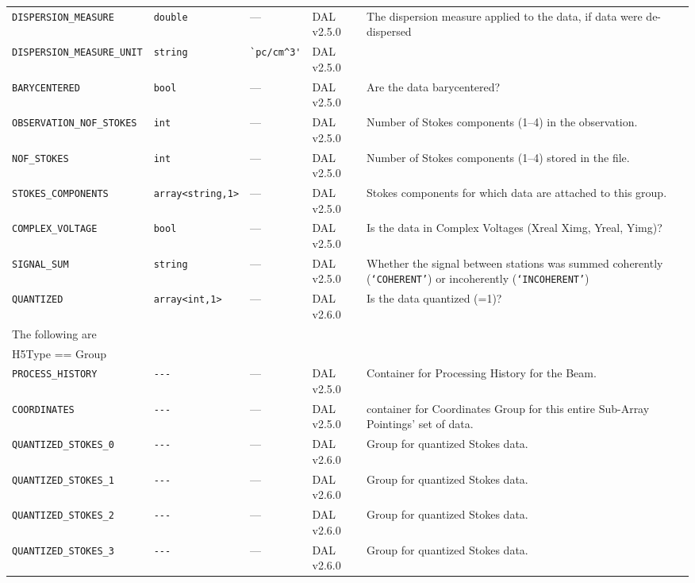 \documentclass[a4paper,10pt,bibtotoc]{scrartcl}
\begin{document}
\begin{supertabular}{|llllp{5.0cm}|}
  \small{\verb|DISPERSION_MEASURE|}     & \verb|double| & --- & DAL v2.5.0 &  The dispersion 
  measure applied to the data, if data were de-dispersed \\
  \small{\verb|DISPERSION_MEASURE_UNIT|}     & \verb|string| & \verb|`pc/cm^3'| & DAL v2.5.0 & \\
  \small{\verb|BARYCENTERED|}   & \verb|bool| & --- & DAL v2.5.0 & Are the data barycentered? \\
  \small{\verb|OBSERVATION_NOF_STOKES|}   & \verb|int|     & --- & DAL v2.5.0 & Number of Stokes
  components (1--4) in the observation. \\
  \small{\verb|NOF_STOKES|}   & \verb|int|     & --- & DAL v2.5.0 & Number of Stokes
  components (1--4) stored in the file. \\
  \small{\verb|STOKES_COMPONENTS|} & \verb|array<string,1>| & --- & DAL v2.5.0 & Stokes
  components for which data are attached to this group. \\
  \small{\verb|COMPLEX_VOLTAGE|}  & \verb|bool| & --- & DAL v2.5.0 & Is the data in Complex
  Voltages (Xreal Ximg, Yreal, Yimg)? \\
  \small{\verb|SIGNAL_SUM|} & \verb|string| & --- & DAL v2.5.0 & Whether the signal between stations was summed coherently
  (\texttt{`COHERENT'}) or incoherently (\texttt{`INCOHERENT'}) \\
  \small{\verb|QUANTIZED|}  & \verb|array<int,1>| & --- & DAL v2.6.0 & Is the data quantized (=1)? \\
  \hline
  \sc The following are & \sc & \sc & \sc   &\\
  \sc H5Type == Group & \sc & \sc & \sc   &\\
  \hline
  \small{\verb|PROCESS_HISTORY|}  & \verb|---| & --- & DAL v2.5.0 & Container for Processing History for the Beam.  \\
  \small{\verb|COORDINATES|}  & \verb|---| & --- & DAL v2.5.0 &  container for Coordinates
  Group for this entire Sub-Array Pointings' set of data. \\
  \small{\verb|QUANTIZED_STOKES_0|}   & \verb|---| & --- & DAL v2.6.0 & Group for quantized Stokes data. \\
  \small{\verb|QUANTIZED_STOKES_1|}   & \verb|---| & --- & DAL v2.6.0 & Group for quantized Stokes data. \\
  \small{\verb|QUANTIZED_STOKES_2|}   & \verb|---| & --- & DAL v2.6.0 & Group for quantized Stokes data. \\
  \small{\verb|QUANTIZED_STOKES_3|}   & \verb|---| & --- & DAL v2.6.0 & Group for quantized Stokes data. \\

\end{supertabular}
\end{document}

